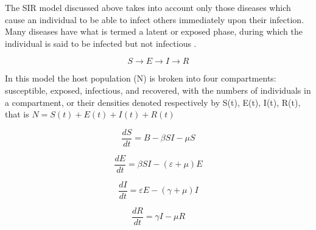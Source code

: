 The SIR model discussed above takes into account only those diseases which cause an individual to be able to infect others immediately upon their infection. Many diseases have what is termed a latent or exposed phase, during which the individual is said to be infected but not infectious \cite{per14}.

\begin{equation}
S \rightarrow E \rightarrow I \rightarrow R
\end{equation}

In this model the host population (N) is broken into four compartments: susceptible, exposed, infectious, and recovered, with the numbers of individuals in a compartment, or their densities denoted respectively by S(t), E(t), I(t), R(t), that is $N = S(t) + E(t) + I(t) + R(t)$

\begin{equation}
\frac{dS}{dt} = B -\beta S I - \mu S
\end{equation}

\begin{equation}
\frac{dE}{dt} = \beta S I - (\varepsilon + \mu) E
\end{equation}

\begin{equation}
\frac{dI}{dt} = \varepsilon E - (\gamma + \mu) I
\end{equation}

\begin{equation}
\frac{dR}{dt} = \gamma I - \mu R
\end{equation}